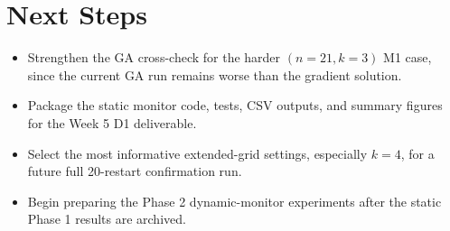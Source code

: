 \documentclass[11pt,a4paper]{article}
\begin{document}
\section{Next Steps}

\begin{itemize}
  \item Strengthen the GA cross-check for the harder $(n=21,k=3)$ M1 case,
  since the current GA run remains worse than the gradient solution.
  \item Package the static monitor code, tests, CSV outputs, and summary figures
  for the Week 5 D1 deliverable.
  \item Select the most informative extended-grid settings, especially $k=4$,
  for a future full 20-restart confirmation run.
  \item Begin preparing the Phase 2 dynamic-monitor experiments after the static
  Phase 1 results are archived.
\end{itemize}
\end{document}
